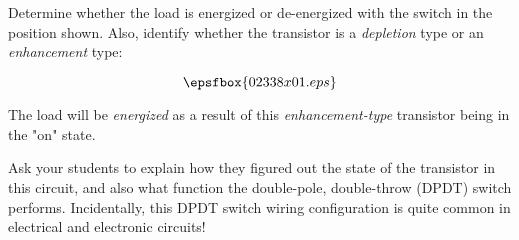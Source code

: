

Determine whether the load is energized or de-energized with the switch in the position shown.  Also, identify whether the transistor is a {\it depletion} type or an {\it enhancement} type:

$$\epsfbox{02338x01.eps}$$







The load will be {\it energized} as a result of this {\it enhancement-type} transistor being in the "on" state.







Ask your students to explain how they figured out the state of the transistor in this circuit, and also what function the double-pole, double-throw (DPDT) switch performs.  Incidentally, this DPDT switch wiring configuration is quite common in electrical and electronic circuits!




